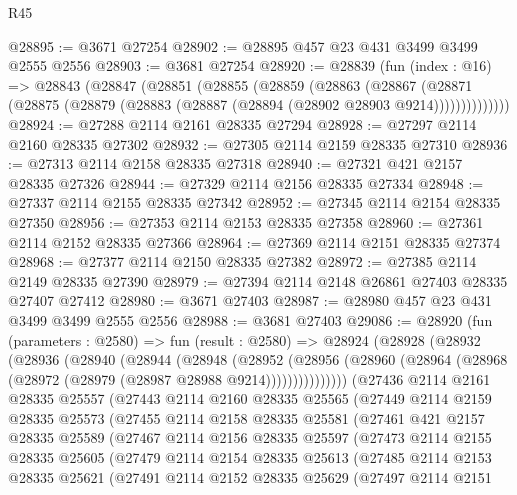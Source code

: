 \begin{lexlean}{R45}
\begin{coremodule}
@28895 := @3671 @27254
@28902 := @28895 @457 @23 @431 @3499 @3499 @2555 @2556
@28903 := @3681 @27254
@28920 := @28839
    (fun (index : @16) =>
    @28843
      (@28847
        (@28851
          (@28855
            (@28859
              (@28863
                (@28867
                  (@28871 (@28875 (@28879 (@28883 (@28887 (@28894 (@28902 @28903 @9214))))))))))))))
@28924 := @27288 @2114 @2161 @28335 @27294
@28928 := @27297 @2114 @2160 @28335 @27302
@28932 := @27305 @2114 @2159 @28335 @27310
@28936 := @27313 @2114 @2158 @28335 @27318
@28940 := @27321 @421 @2157 @28335 @27326
@28944 := @27329 @2114 @2156 @28335 @27334
@28948 := @27337 @2114 @2155 @28335 @27342
@28952 := @27345 @2114 @2154 @28335 @27350
@28956 := @27353 @2114 @2153 @28335 @27358
@28960 := @27361 @2114 @2152 @28335 @27366
@28964 := @27369 @2114 @2151 @28335 @27374
@28968 := @27377 @2114 @2150 @28335 @27382
@28972 := @27385 @2114 @2149 @28335 @27390
@28979 := @27394 @2114 @2148 @26861 @27403 @28335 @27407 @27412
@28980 := @3671 @27403
@28987 := @28980 @457 @23 @431 @3499 @3499 @2555 @2556
@28988 := @3681 @27403
@29086 := @28920
    (fun (parameters : @2580) =>
    fun (result : @2580) =>
    @28924
      (@28928
        (@28932
          (@28936
            (@28940
              (@28944
                (@28948
                  (@28952
                    (@28956
                      (@28960 (@28964 (@28968 (@28972 (@28979 (@28987 @28988 @9214)))))))))))))))
    (@27436
      @2114
      @2161
      @28335
      @25557
      (@27443
        @2114
        @2160
        @28335
        @25565
        (@27449
          @2114
          @2159
          @28335
          @25573
          (@27455
            @2114
            @2158
            @28335
            @25581
            (@27461
              @421
              @2157
              @28335
              @25589
              (@27467
                @2114
                @2156
                @28335
                @25597
                (@27473
                  @2114
                  @2155
                  @28335
                  @25605
                  (@27479
                    @2114
                    @2154
                    @28335
                    @25613
                    (@27485
                      @2114
                      @2153
                      @28335
                      @25621
                      (@27491
                        @2114
                        @2152
                        @28335
                        @25629
                        (@27497
                          @2114
                          @2151

\end{coremodule}
\end{lexlean}
